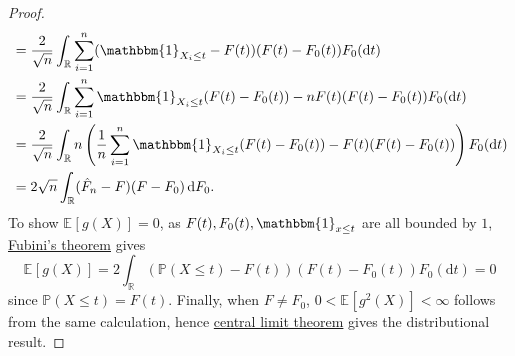 \begin{proof}
\[\begin{split}
			 & = \frac{2}{\sqrt{n} } \int _\mathbb{R} \sum_{i=1}^{n} (\mathbbm{1}_{X_i \leq t} - F(t)) (F(t) - F_0(t)) F_0(\mathrm{d} t)                                            \\
			 & = \frac{2}{\sqrt{n} } \int _\mathbb{R} \sum_{i=1}^{n} \mathbbm{1}_{X_i \leq t} (F(t) - F_0(t)) - n F(t) (F(t) - F_0(t)) F_0(\mathrm{d} t)                            \\
			 & = \frac{2}{\sqrt{n} } \int _\mathbb{R} n \left( \frac{1}{n} \sum_{i=1}^{n} \mathbbm{1}_{X_i \leq t} (F(t) - F_0(t)) - F(t) (F(t) - F_0(t)) \right) F_0(\mathrm{d} t) \\
			 & = 2\sqrt{n} \int _\mathbb{R} (\hat{F} _n - F)(F - F_0) \,\mathrm{d} F_0.
		\end{split}
	\]
	To show \(\mathbb{E}_{}[g(X)] = 0\), as \(F(t), F_0(t), \mathbbm{1}_{x \leq t}\) are all bounded by \(1\), \href{https://en.wikipedia.org/wiki/Fubini's_theorem}{Fubini's theorem} gives
	\[
		\mathbb{E}_{}[g(X)]
		= 2 \int _\mathbb{R} (\mathbb{P} (X \leq t) - F(t)) (F(t) - F_0(t)) F_0(\mathrm{d} t)
		= 0
	\]
	since \(\mathbb{P} (X \leq t) = F(t)\). Finally, when \(F \neq F_0\), \(0 < \mathbb{E}_{}[g^2(X)] < \infty \) follows from the same calculation, hence \hyperref[thm:CLT]{central limit theorem} gives the distributional result.
\end{proof}